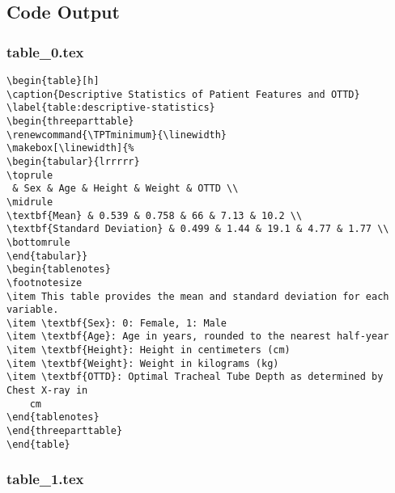 \documentclass[11pt]{article}
\begin{document}
\subsection{Code Output}

\subsubsection*{table\_0.tex}

\begin{Verbatim}[tabsize=4]
\begin{table}[h]
\caption{Descriptive Statistics of Patient Features and OTTD}
\label{table:descriptive-statistics}
\begin{threeparttable}
\renewcommand{\TPTminimum}{\linewidth}
\makebox[\linewidth]{%
\begin{tabular}{lrrrrr}
\toprule
 & Sex & Age & Height & Weight & OTTD \\
\midrule
\textbf{Mean} & 0.539 & 0.758 & 66 & 7.13 & 10.2 \\
\textbf{Standard Deviation} & 0.499 & 1.44 & 19.1 & 4.77 & 1.77 \\
\bottomrule
\end{tabular}}
\begin{tablenotes}
\footnotesize
\item This table provides the mean and standard deviation for each variable.
\item \textbf{Sex}: 0: Female, 1: Male
\item \textbf{Age}: Age in years, rounded to the nearest half-year
\item \textbf{Height}: Height in centimeters (cm)
\item \textbf{Weight}: Weight in kilograms (kg)
\item \textbf{OTTD}: Optimal Tracheal Tube Depth as determined by Chest X-ray in
	cm
\end{tablenotes}
\end{threeparttable}
\end{table}

\end{Verbatim}

\subsubsection*{table\_1.tex}
\end{document}
